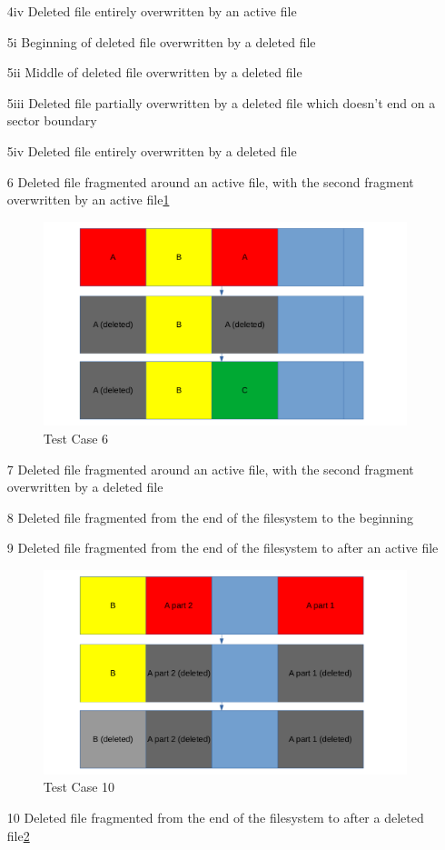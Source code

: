\begin{itemize}
    \item [4iv] Deleted file entirely overwritten by an active file
    \item [5i] Beginning of deleted file overwritten by a deleted file
    \item [5ii] Middle of deleted file overwritten by a deleted file
    \item [5iii] Deleted file partially overwritten by a deleted file which doesn't end on a sector boundary
    \item [5iv] Deleted file entirely overwritten by a deleted file
    \item [6] Deleted file fragmented around an active file, with the second fragment overwritten by an active file\ref{fig:case_6}
    \begin{figure}[h]
        \centering
        \includegraphics[width=\linewidth]{fig/case6.png}
        \caption{Test Case 6}
        \label{fig:case_6}
    \end{figure}
    \item [7] Deleted file fragmented around an active file, with the second fragment overwritten by a deleted file
    \item [8] Deleted file fragmented from the end of the filesystem to the beginning
    \item [9] Deleted file fragmented from the end of the filesystem to after an active file
    \begin{figure}[h]
        \centering
        \includegraphics[width=\linewidth]{fig/case10.png}
        \caption{Test Case 10}
        \label{fig:case_10}
    \end{figure}
    \item [10] Deleted file fragmented from the end of the filesystem to after a deleted file\ref{fig:case_10}
\end{itemize}


